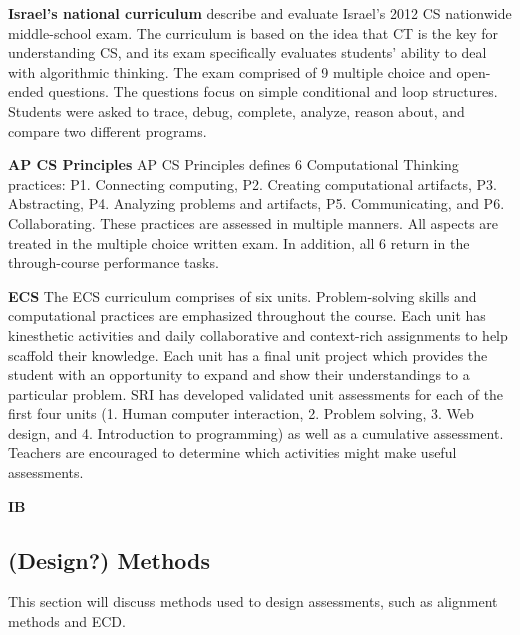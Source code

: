 \noindent\textbf{Israel's national curriculum}
 describe and evaluate Israel's 2012 CS nationwide middle-school exam. The curriculum is based on the idea that CT is the key for understanding CS, and its exam specifically evaluates students' ability to deal with algorithmic thinking. The exam comprised of 9 multiple choice and open-ended questions. The questions focus on simple conditional and loop structures. Students were asked to trace, debug, complete, analyze, reason about, and compare two different programs.

\noindent\textbf{AP CS Principles}
AP CS Principles defines 6 Computational Thinking practices: P1. Connecting computing, P2. Creating computational artifacts, P3. Abstracting, P4. Analyzing problems and artifacts, P5. Communicating, and P6. Collaborating. These practices are assessed in multiple manners. All aspects are treated in the multiple choice written exam. In addition, all 6 return in the through-course performance tasks.

\noindent\textbf{ECS}
The ECS  curriculum comprises of six units. Problem-solving skills and computational practices are emphasized throughout the course. Each unit has kinesthetic activities and daily collaborative and context-rich assignments to help scaffold their knowledge. Each unit has a final unit project which provides the student with an opportunity to expand and show their understandings to a particular problem. SRI has developed validated unit assessments for each of the first four units (1. Human computer interaction, 2. Problem solving, 3. Web design, and 4. Introduction to programming) as well as a cumulative assessment. Teachers are encouraged to determine which activities might make useful assessments.


\noindent\textbf{IB}



\subsection{(Design?) Methods}
This section will discuss methods used to design assessments, such as alignment methods and ECD.


